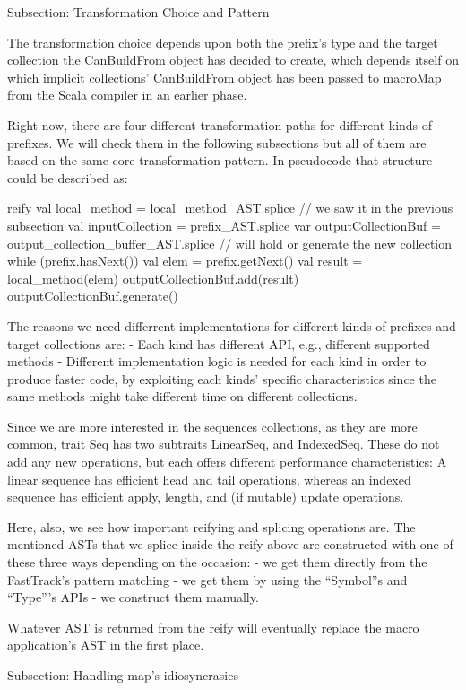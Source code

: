 Subsection: Transformation Choice and Pattern

The transformation choice depends upon both the prefix's type and  the
target collection the CanBuildFrom object has decided to create, which depends
itself on which implicit collections' CanBuildFrom object has been passed to
macroMap from the Scala compiler in an earlier phase.

Right now, there are four different transformation paths for different kinds of
prefixes. We will check them in the following subsections but all of them are
based on the same core transformation pattern. In pseudocode that structure
could be described as:

reify {
  val local_method = local_method_AST.splice // we saw it in the previous
subsection
  val inputCollection = prefix_AST.splice
  var outputCollectionBuf = output_collection_buffer_AST.splice // will
hold or generate the new collection
  while (prefix.hasNext()) {
    val elem = prefix.getNext()
    val result = local_method(elem)
    outputCollectionBuf.add(result)
  }
  outputCollectionBuf.generate()
}

The reasons we need differrent implementations for different kinds of
prefixes and target collections are:
- Each kind has different API, e.g., different supported methods
- Different implementation logic is needed for each kind in order to produce
faster code, by exploiting each kinds' specific characteristics since the same
methods might take different time on different collections.

Since we are more interested in the sequences collections, as they are more
common, trait Seq has two subtraits LinearSeq, and IndexedSeq. These do not add
any new operations, but each offers different performance characteristics: A
linear sequence has efficient head and tail operations, whereas an indexed
sequence has efficient apply, length, and (if mutable) update operations. 

Here, also, we see how important reifying and splicing operations are. The
mentioned ASTs that we splice inside the reify above are constructed with one of
these three ways depending on the occasion:
- we get them directly from the FastTrack's pattern matching
- we get them by using the ``Symbol''s and ``Type'''s APIs
- we construct them manually.

Whatever AST is returned from the reify will eventually replace the macro
application's AST in the first place.


Subsection: Handling map's idiosyncrasies

